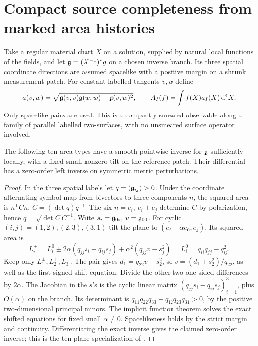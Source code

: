 \section{Compact source completeness from marked area histories}\label{sec:area}
Take a regular material chart \(X\) on a solution, supplied by natural local functions of the fields, and let \(\mathfrak g=(X^{-1})^*g\) on a chosen inverse branch. Its three spatial coordinate directions are assumed spacelike with a positive margin on a shrunk measurement patch. For constant labelled tangents \(v,w\) define
\[
 a(v,w)=\sqrt{\mathfrak g(v,v)\mathfrak g(w,w)-\mathfrak g(v,w)^2},\qquad
 A_I(f)=\int f(X)a_I(X)\,\mathrm d^4X .
\]
Only spacelike pairs are used. This is a compactly smeared observable along a family of parallel labelled two-surfaces, with no unsmeared surface operator involved.

\begin{lemma}\label{lem:area}
The following ten area types have a smooth pointwise inverse for \(\mathfrak g\) sufficiently locally, with a fixed small nonzero tilt on the reference patch. Their differential has a zero-order left inverse on symmetric metric perturbations.
\end{lemma}
\begin{proof}
In the three spatial labels let \(q=(\mathfrak g_{ij})>0\). Under the coordinate alternating-symbol map from bivectors to three components \(n\), the squared area is \(n^{\mathsf T}C n\), \(C=(\det q)q^{-1}\). The six \(n=e_i,\ e_i+e_j\) determine \(C\) by polarization, hence \(q=\sqrt{\det C}C^{-1}\). Write \(s_i=\mathfrak g_{0i}\), \(v=\mathfrak g_{00}\). For cyclic \((i,j)=(1,2),(2,3),(3,1)\) tilt the plane to \((e_i\pm\alpha e_0,e_j)\). Its squared area is
\[
 L_i^\pm=L_i^0\pm2\alpha(q_{jj}s_i-q_{ij}s_j)
              +\alpha^2(q_{jj}v-s_j^2),\quad L_i^0=q_{ii}q_{jj}-q_{ij}^2.
\]
Keep only \(L_1^\pm,L_2^+,L_3^+\). The pair gives \(d_1=q_{22}v-s_2^2\), so \(v=(d_1+s_2^2)/q_{22}\), as well as the first signed shift equation. Divide the other two one-sided differences by \(2\alpha\). The Jacobian in the \(s\)'s is the cyclic linear matrix \((q_{jj}s_i-q_{ij}s_j)_{i=1}^3\), plus \(O(\alpha)\) on the branch. Its determinant is \(q_{11}q_{22}q_{33}-q_{12}q_{23}q_{31}>0\), by the positive two-dimensional principal minors. The implicit function theorem solves the exact shifted equations for fixed small \(\alpha\ne0\). Spacelikeness holds by the strict margin and continuity. Differentiating the exact inverse gives the claimed zero-order inverse; this is the ten-plane specialization of \cite{P47}.
\end{proof}


